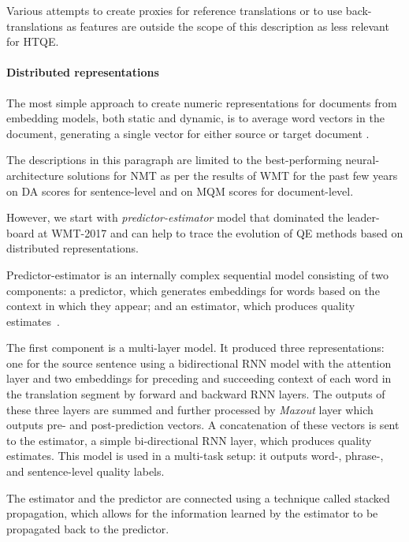 Various attempts to create proxies for reference translations or to use back-translations as features are outside the scope of this description as less relevant for HTQE. 


\paragraph{\label{par:distributed}Distributed representations} 
The most simple approach to create numeric representations for documents from embedding models, both static and dynamic, is to average word vectors in the document, generating a single vector for either source or target document \cite[see][p.73]{Specia2018a}.

The descriptions in this paragraph are limited to the best-performing neural-architecture solutions for NMT as per the results of WMT for the past few years on DA scores for sentence-level and on MQM scores for document-level. 

However, we start with \textit{predictor-estimator} model that dominated the leader-board at WMT-2017 and can help to trace the evolution of QE methods based on distributed representations. 

Predictor-estimator is an internally complex sequential model consisting of two components: a predictor, which generates embeddings for words based on the context in which they appear; and an estimator, which produces quality estimates~\cite[POSTECH]{Kim2017b}. 

The first component is a multi-layer model. It produced three representations: one for the source sentence using a bidirectional \gls{RNN} model with the attention layer and two embeddings for preceding and succeeding context of each word in the translation segment by forward and backward RNN layers. The outputs of these three layers are summed and further processed by \textit{Maxout} layer which outputs pre- and post-prediction vectors. A concatenation of these vectors is sent to the estimator, a simple bi-directional RNN layer, which produces quality estimates.
This model is used in a multi-task setup: it outputs word-, phrase-, and sentence-level quality labels.

The estimator and the predictor are connected using a technique called stacked propagation, which allows for the information learned by the estimator to be propagated back to the predictor.

